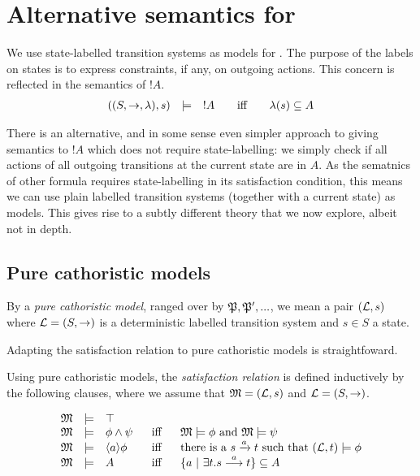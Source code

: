 \section{Alternative semantics for \cathoristic{}}\label{pureModels}

\NI We use state-labelled transition systems as models for
\cathoristic{}. The purpose of the labels on states is to express
constraints, if any, on outgoing actions. This concern is reflected in
the semantics of $!A$.
\[
\begin{array}{lclcl}
  ((S, \rightarrow, \lambda), s) & \models & !A  &\mbox{\quad iff\quad } & \lambda(s) \subseteq A
\end{array}
\]

\NI There is an alternative, and in some sense even simpler approach
to giving semantics to $!A$ which does not require state-labelling: we
simply check if all actions of all outgoing transitions at the current
state are in $A$.  As the sematnics of other formula requires state-labelling in its satisfaction condition, this means we can use plain
labelled transition systems (together with a current state) as
models. This gives rise to a subtly different theory that we now
explore, albeit not in depth.

\subsection{Pure cathoristic models}

\begin{definition}\label{pureModelsDef}
By a \emph{pure cathoristic model}, ranged over by $\frak{P}, \frak{P}', ...$,
we mean a pair $(\mathcal{L}, s)$ where $\mathcal{L} = (S, \rightarrow)$ is a
deterministic labelled transition system and $s \in S$ a state.
\end{definition}

\NI Adapting the satisfaction relation to pure cathoristic models is
straightfoward.

\begin{definition}
Using pure cathoristic models, the  \emph{satisfaction relation} is defined 
inductively by the following clauses, where we assume that $\frak{M} =
(\mathcal{L}, s)$ and $\mathcal{L} = (S, \rightarrow)$.

\[
\begin{array}{lclcl}
  \frak{M} & \models & \top   \\
  \frak{M} & \models & \phi \land \psi &\ \mbox{ iff } \ & \frak{M}  \models \phi \mbox { and } \frak{M} \models \psi  \\
  \frak{M} & \models & \langle a \rangle \phi & \mbox{ iff } & \text{there is a } s \xrightarrow{a} t \mbox { such that } (\mathcal{L}, t) \models \phi  \\
  \frak{M} & \models & A &\mbox{ iff } & \{a\ |\ \exists t.s \stackrel{a}{\longrightarrow} t \} \subseteq A
\end{array}
\]
\end{definition}

